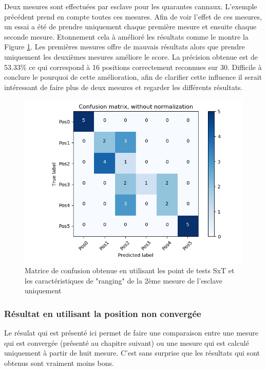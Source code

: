 Deux mesures sont effectuées par esclave pour les quarantes cannaux. L'exemple précédent prend en compte toutes ces mesures. Afin de voir l'effet de ces mesures, un essai a été de prendre uniquement chaque première mesure et ensuite chaque seconde mesure. Etonnement cela à amélioré les résultats comme le montre la Figure \ref{fig:matPosSxTRaw1}. Les premières mesures offre de mauvais résultats alors que prendre uniquement les deuxièmes mesures améliore le score. La précision obtenue est de 53.33\% ce qui correspond à 16 positions correctement reconnues sur 30. Difficile à conclure le pourquoi de cette amélioration, afin de clarifier cette influence il serait intéressant de faire plus de deux mesures et regarder les différents résultats.
\begin{figure}[htp]
	\begin{center}
		\includegraphics[scale=0.5]{figures/mat_pos_SxT_raw1.png}
		\caption{Matrice de confusion obtenue en utilisant les point de tests SxT et les caractéristiques de "ranging" de la 2ème mesure de l'esclave uniquement}
		\label{fig:matPosSxTRaw1} %
	\end{center}
\end{figure}

\subsubsection{Résultat en utilisant la position non convergée}
Le résulat qui est présenté ici permet de faire une comparaison entre une mesure qui est convergée (présenté au chapitre suivant) ou une mesure qui est calculé uniquement à partir de huit mesure. C'est sans surprise que les résultats qui sont obtenus sont vraiment moins bons.

